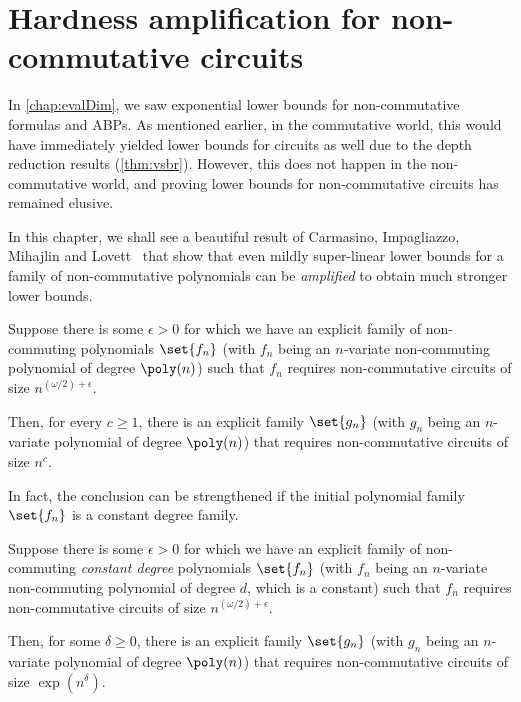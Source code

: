 \chapter{Hardness amplification for non-commutative circuits}
\label{chap:nc-hardness-amp}

In \autoref{chap:evalDim}, we saw exponential lower bounds for non-commutative formulas and ABPs. As mentioned earlier, in the commutative world, this would have immediately yielded lower bounds for circuits as well due to the depth reduction results (\autoref{thm:vsbr}). However, this does not happen in the non-commutative world, and proving lower bounds for non-commutative circuits has remained elusive.

In this chapter, we shall see a beautiful result of Carmasino, Impagliazzo, Mihajlin and Lovett~\cite{CILM18} that show that even mildly super-linear lower bounds for a family of non-commutative polynomials can be \emph{amplified} to obtain much stronger lower bounds.

\begin{theorem} \label{thm:CILM18-mainthm}
  Suppose there is some $\epsilon > 0$ for which we have an explicit family of non-commuting polynomials $\set{f_n}$ (with $f_n$ being an $n$-variate non-commuting polynomial of degree $\poly(n)$) such that $f_n$ requires non-commutative circuits of size $n^{(\omega/2) + \epsilon}$.

  Then, for every $c \geq 1$, there is an explicit family $\set{g_n}$ (with $g_n$ being an $n$-variate polynomial of degree $\poly(n)$) that requires non-commutative circuits of size $n^c$.
\end{theorem}

In fact, the conclusion can be strengthened if the initial polynomial family $\set{f_n}$ is a constant degree family.

\begin{theorem} \label{thm:CILM18-mainthm-constdeg}
  Suppose there is some $\epsilon > 0$ for which we have an explicit family of non-commuting \emph{constant degree} polynomials $\set{f_n}$ (with $f_n$ being an $n$-variate non-commuting polynomial of degree $d$, which is a constant) such that $f_n$ requires non-commutative circuits of size $n^{(\omega/2) + \epsilon}$.

  Then, for some $\delta \geq 0$, there is an explicit family $\set{g_n}$ (with $g_n$ being an $n$-variate polynomial of degree $\poly(n)$) that requires non-commutative circuits of size $\exp(n^{\delta})$.
\end{theorem}

